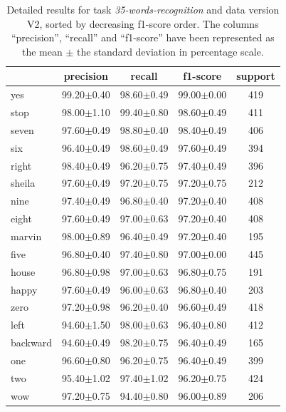 \documentclass[review]{elsarticle}
\begin{document}
\begin{table} \centering \scriptsize
	\caption{Detailed results for task \textit{35-words-recognition} and data version V2, sorted by decreasing f1-score order. The columns ``precision'', ``recall'' and ``f1-score'' have been represented as the mean $\pm$ the standard deviation in percentage scale. }
	\begin{tabular}{lcccc}
		\toprule
		{} &       precision &          recall &        f1-score & support \\
		\midrule
		yes       &  99.20$\pm$0.40 &  98.60$\pm$0.49 &  99.00$\pm$0.00 &     419 \\
		stop      &  98.00$\pm$1.10 &  99.40$\pm$0.80 &  98.60$\pm$0.49 &     411 \\
		seven     &  97.60$\pm$0.49 &  98.80$\pm$0.40 &  98.40$\pm$0.49 &     406 \\
		six       &  96.40$\pm$0.49 &  98.60$\pm$0.49 &  97.60$\pm$0.49 &     394 \\
		right     &  98.40$\pm$0.49 &  96.20$\pm$0.75 &  97.40$\pm$0.49 &     396 \\
		sheila    &  97.60$\pm$0.49 &  97.20$\pm$0.75 &  97.20$\pm$0.75 &     212 \\
		nine      &  97.40$\pm$0.49 &  96.80$\pm$0.40 &  97.20$\pm$0.40 &     408 \\
		eight     &  97.60$\pm$0.49 &  97.00$\pm$0.63 &  97.20$\pm$0.40 &     408 \\
		marvin    &  98.00$\pm$0.89 &  96.40$\pm$0.49 &  97.20$\pm$0.40 &     195 \\
		five      &  96.80$\pm$0.40 &  97.40$\pm$0.80 &  97.00$\pm$0.00 &     445 \\
		house     &  96.80$\pm$0.98 &  97.00$\pm$0.63 &  96.80$\pm$0.75 &     191 \\
		happy     &  97.60$\pm$0.49 &  96.00$\pm$0.63 &  96.80$\pm$0.40 &     203 \\
		zero      &  97.20$\pm$0.98 &  96.20$\pm$0.40 &  96.60$\pm$0.49 &     418 \\
		left      &  94.60$\pm$1.50 &  98.00$\pm$0.63 &  96.40$\pm$0.80 &     412 \\
		backward  &  94.60$\pm$0.49 &  98.20$\pm$0.75 &  96.40$\pm$0.49 &     165 \\
		one       &  96.60$\pm$0.80 &  96.20$\pm$0.75 &  96.40$\pm$0.49 &     399 \\
		two       &  95.40$\pm$1.02 &  97.40$\pm$1.02 &  96.20$\pm$0.75 &     424 \\
		wow       &  97.20$\pm$0.75 &  94.40$\pm$0.80 &  96.00$\pm$0.89 &     206 \\

\end{tabular}
\end{table}
\end{document}
